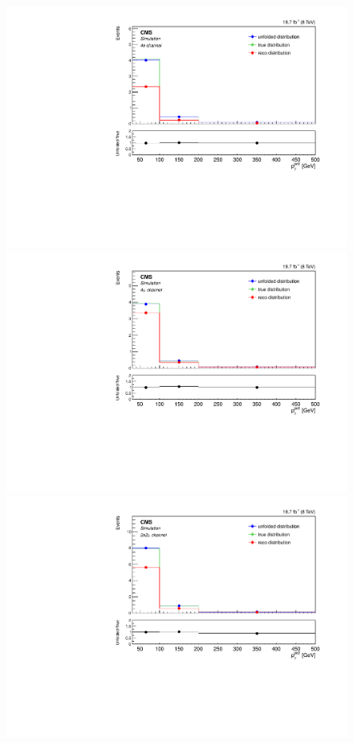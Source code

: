 \begin{figure}[hbtp]
\begin{center}
    \includegraphics[width=0.8\cmsFigWidth]{Figures/Unfolding/MCTests/PtJet2_ZZTo4e_MadMatrix_MadDistr_HalfSample_fr}     
    \includegraphics[width=0.8\cmsFigWidth]{Figures/Unfolding/MCTests/PtJet2_ZZTo4m_MadMatrix_MadDistr_HalfSample_fr}     
    \includegraphics[width=0.8\cmsFigWidth]{Figures/Unfolding/MCTests/PtJet2_ZZTo2e2m_MadMatrix_MadDistr_HalfSample_fr}     

\end{center}
\end{figure}
